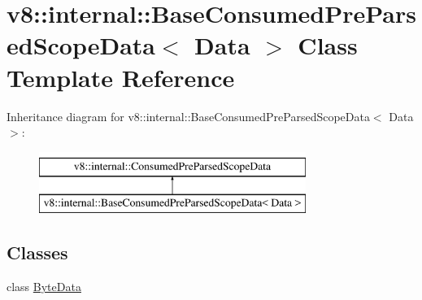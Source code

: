 \hypertarget{classv8_1_1internal_1_1BaseConsumedPreParsedScopeData}{}\section{v8\+:\+:internal\+:\+:Base\+Consumed\+Pre\+Parsed\+Scope\+Data$<$ Data $>$ Class Template Reference}
\label{classv8_1_1internal_1_1BaseConsumedPreParsedScopeData}
Inheritance diagram for v8\+:\+:internal\+:\+:Base\+Consumed\+Pre\+Parsed\+Scope\+Data$<$ Data $>$\+:\begin{figure}[H]
\begin{center}
\leavevmode
\includegraphics[height=2.000000cm]{classv8_1_1internal_1_1BaseConsumedPreParsedScopeData}
\end{center}
\end{figure}
\subsection*{Classes}
\begin{DoxyCompactItemize}
\item 
class \mbox{\hyperlink{classv8_1_1internal_1_1BaseConsumedPreParsedScopeData_1_1ByteData}{Byte\+Data}}
\end{DoxyCompactItemize}
